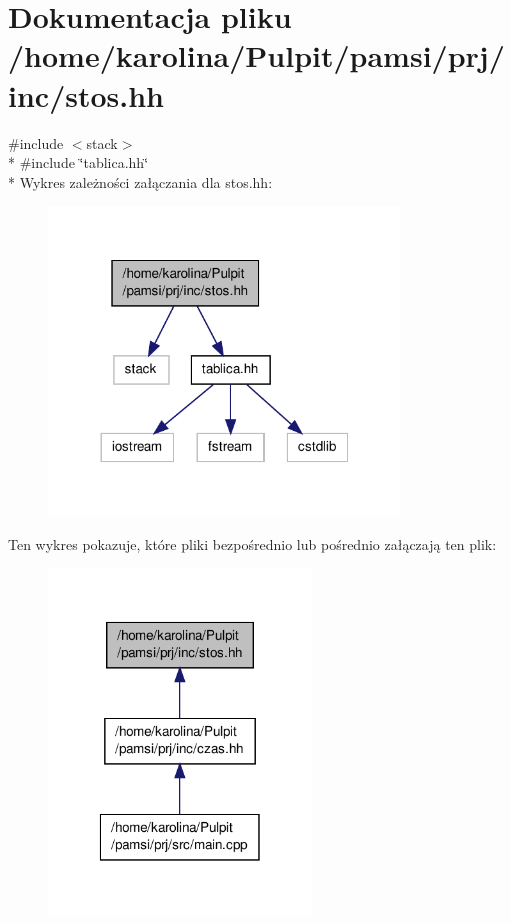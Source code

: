\hypertarget{stos_8hh}{\section{Dokumentacja pliku /home/karolina/\-Pulpit/pamsi/prj/inc/stos.hh}
\label{stos_8hh}
}
{\ttfamily \#include $<$stack$>$}\\*
{\ttfamily \#include \char`\"{}tablica.\-hh\char`\"{}}\\*
Wykres zależności załączania dla stos.\-hh\-:\nopagebreak
\begin{figure}[H]
\begin{center}
\leavevmode
\includegraphics[width=264pt]{stos_8hh__incl}
\end{center}
\end{figure}
Ten wykres pokazuje, które pliki bezpośrednio lub pośrednio załączają ten plik\-:\nopagebreak
\begin{figure}[H]
\begin{center}
\leavevmode
\includegraphics[width=198pt]{stos_8hh__dep__incl}
\end{center}
\end{figure}
